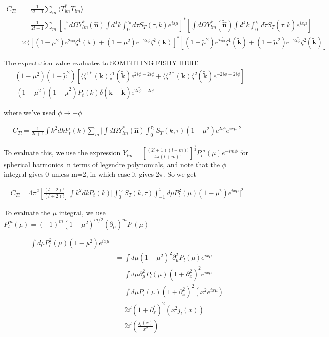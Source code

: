 \documentclass[a4paper,11pt]{article}
\renewcommand{\v}[1]{\mathbf{#1}}
\newcommand{\half}{\frac{1}{2}}
\newcommand{\unit}[1]{\hat{\v{#1}}}
\newcommand{\ltwof}{[\frac{(l-2)!}{(l+2)!}]}
\begin{document}
\begin{align}
C_{Tl} &= \frac{1}{2l+1}\sum_m \langle T_{lm}^*T_{lm} \rangle \\
&= \frac{1}{2l+1} \sum_m [\int d\Omega Y_{lm}^*(\unit{n})\int d^3k\int_0^{\tau_0}d\tau S_T(\tau,k)e^{ix\mu}]^*
[\int d\Omega Y_{lm}^*(\tilde{\unit{n}})\int d^3\tilde{k}\int_0^{\tau_0}d\tilde{\tau}S_T(\tau,\tilde{k})e^{i\tilde{x}\tilde{\mu}}]\\
&\times
\langle [(1-\mu^2) e^{2i\phi} \zeta^1(\v{k})+(1-\mu^2) e^{-2i\phi} \zeta^2(\v{k})]^*[(1-\tilde{\mu}^2) e^{2i\tilde{\phi}} \zeta^1(\v{\tilde{k}})+(1-\tilde{\mu}^2) e^{-2i\tilde{\phi}} \zeta^2(\v{\tilde{k}})]
\end{align}

The expectation value evaluates to
SOMEHTING FISHY HERE
\begin{align}
&(1-\mu^2)(1-\tilde{\mu}^2)[\langle\zeta^{1*}(\v{k})\zeta^1(\v{\tilde{k}})e^{2i\tilde{\phi}-2i\phi}+\langle\zeta^{2*}(\v{k})\zeta^2(\v{\tilde{k}})e^{-2i\tilde{\phi}+2i\phi}]\\
&~ (1-\mu^2)(1-\tilde{\mu}^2)P_t(k)\delta(\v{k}-\v{\tilde{k}})e^{2i\tilde{\phi}-2i\phi}
\end{align}

where we've used $\phi\rightarrow -\phi$ 

\begin{align}
C_{Tl} = \frac{1}{2l+1} \int k^2 dk P_t(k) \sum_m \bigg| \int d\Omega Y^*_{lm}(\unit{n}) \int_0^{\tau_0} S_T(k,\tau)(1-\mu^2)e^{2i\phi}e^{ix\mu} \bigg|^2
\end{align}

To evaluate this, we use the expression $Y_{lm} = [\frac{(2l+1)(l-m)!}{4\pi(l+m)!}]^\half P_l^m(\mu)e^{-im\phi}$ for spherical harmonics in terms of legendre polynomials, and note that the $\phi$ integral gives 0 unless m=2, in which case it gives $2\pi$. So we get 

\begin{align}
C_{Tl} = 4\pi^2\ltwof \int k^2 dk P_t(k) \bigg|  \int_0^{\tau_0} S_T(k,\tau)\int_{-1}^1 d\mu P_l^2(\mu)(1-\mu^2)e^{ix\mu} \bigg|^2
\end{align}

To evaluate the $\mu$ integral, we use $P^m_l(\mu)=(-1)^m(1-\mu^2)^{m/2}(\partial_\mu)^mP_l(\mu)$


\begin{align}
\int d\mu P_l^2(\mu)(1-\mu^2)e^{ix\mu} \\
&= \int d\mu(1-\mu^2)^2 \partial_\mu^2P_l(\mu)e^{ix\mu}\\
&= \int d\mu \partial_\mu^2P_l(\mu)(1+\partial_x^2)^2e^{ix\mu}\\
&= \int d\mu P_l(\mu)(1+\partial_x^2)^2(x^2e^{ix\mu})\\
&= 2i^l(1+\partial_x^2)^2(x^2j_l(x))\\
&= 2i^l(\frac{j_l(x)}{x^2})
\end{align}
\end{document}
